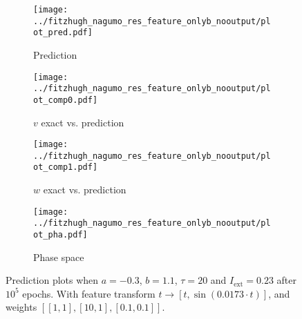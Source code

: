 \documentclass[a4paper]{article}
\begin{document}
\begin{figure}[H]
	\centering 
	\begin{subfigure}[b]{0.47\textwidth}
		\centering
		\texttt{[image: ../fitzhugh\_nagumo\_res\_feature\_onlyb\_nooutput/plot\_pred.pdf]}
		\caption{Prediction}
		\label{fig:justb08a}
	\end{subfigure}
	\begin{subfigure}[b]{0.47\textwidth}
		\centering
		\texttt{[image: ../fitzhugh\_nagumo\_res\_feature\_onlyb\_nooutput/plot\_comp0.pdf]}
		\caption{$v$ exact vs. prediction}
		\label{fig:justb08b}
	\end{subfigure}
	\begin{subfigure}[b]{0.47\textwidth}
		\centering
		\texttt{[image: ../fitzhugh\_nagumo\_res\_feature\_onlyb\_nooutput/plot\_comp1.pdf]}
		\caption{$w$ exact vs. prediction}
		\label{fig:justb08c}
	\end{subfigure}
	\begin{subfigure}[b]{0.47\textwidth}
		\centering
		\texttt{[image: ../fitzhugh\_nagumo\_res\_feature\_onlyb\_nooutput/plot\_pha.pdf]}
		\caption{Phase space}
		\label{fig:justb08d}
	\end{subfigure}
	\caption{Prediction plots when $a=-0.3$, $b=1.1$, $\tau=20$ and $ I_{\text{ext}}=0.23$ after $10^5$ epochs. With feature transform $t \rightarrow \left[ t, \sin(0.0173\cdot t) \right] $, and weights $\left[ \left[ 1, 1\right], \left[ 10, 1\right], \left[ 0.1, 0.1 \right]\right]$.}
	\label{plot:justb08}
\end{figure} 	
\end{document}
